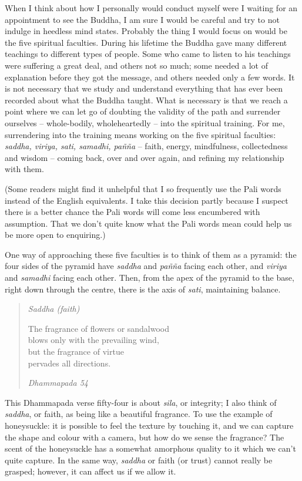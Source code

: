 When I think about how I personally would conduct myself were I waiting
for an appointment to see the Buddha, I am sure I would be careful and
try to not indulge in heedless mind states. Probably the thing I would
focus on would be the five spiritual faculties. During his lifetime the
Buddha gave many different teachings to different types of people. Some
who came to listen to his teachings were suffering a great deal, and
others not so much; some needed a lot of explanation before they got the
message, and others needed only a few words. It is not necessary that we
study and understand everything that has ever been recorded about what
the Buddha taught. What is necessary is that we reach a point where we
can let go of doubting the validity of the path and surrender ourselves
-- whole-bodily, wholeheartedly -- into the spiritual training. For me,
surrendering into the training means working on the five spiritual
faculties: \emph{saddha, viriya, sati, samadhi, pañña} -- faith, energy,
mindfulness, collectedness and wisdom -- coming back, over and over
again, and refining my relationship with them.

(Some readers might find it unhelpful that I so frequently use the Pali
words instead of the English equivalents. I take this decision partly
because I suspect there is a better chance the Pali words will come less
encumbered with assumption. That we don't quite know what the Pali words
mean could help us be more open to enquiring.)

One way of approaching these five faculties is to think of them as a
pyramid: the four sides of the pyramid have \emph{saddha} and
\emph{pañña} facing each other, and \emph{viriya} and \emph{samadhi}
facing each other. Then, from the apex of the pyramid to the base, right
down through the centre, there is the axis of \emph{sati}, maintaining
balance.

\begin{quote}
  \emph{Saddha (faith)}

  The fragrance of flowers or sandalwood\\
  blows only with the prevailing wind,\\
  but the fragrance of virtue\\
  pervades all directions.

  \emph{Dhammapada 54}
\end{quote}

This Dhammapada verse fifty-four is about \emph{sila}, or integrity; I
also think of \emph{saddha}, or faith, as being like a beautiful
fragrance. To use the example of honeysuckle: it is possible to feel the
texture by touching it, and we can capture the shape and colour with a
camera, but how do we sense the fragrance? The scent of the honeysuckle
has a somewhat amorphous quality to it which we can't quite capture. In
the same way, \emph{saddha} or faith (or trust) cannot really be
grasped; however, it can affect us if we allow it.

